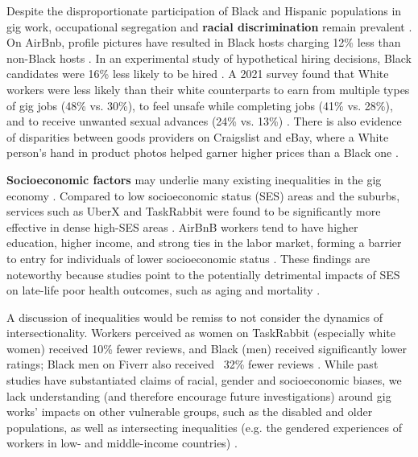 Despite the disproportionate participation of Black and Hispanic populations in gig work, occupational segregation and \textbf{racial discrimination} remain prevalent \cite{England_undated-gk}. On AirBnb, profile pictures have resulted in Black hosts charging 12\% less than non-Black hosts \cite{cSUH}. In an experimental study of hypothetical hiring decisions, Black candidates were 16\% less likely to be hired \cite{Leung2020-rk}. A 2021 survey found that White workers were less likely than their white counterparts to earn from multiple types of gig jobs (48\% vs. 30\%), to feel unsafe while completing jobs (41\% vs. 28\%), and to receive unwanted sexual advances (24\% vs. 13\%) \cite{Gelles-Watnick2021-fz}. There is also evidence of disparities between goods providers on Craigslist and eBay, where a White person's hand in product photos helped garner higher prices than a Black one \cite{Rosenblat2017-bm}.

\textbf{Socioeconomic factors} may underlie many existing inequalities in the gig economy \cite{participation}. Compared to low socioeconomic status (SES) areas and the suburbs, services such as UberX and TaskRabbit were found to be significantly more effective in dense high-SES areas \cite{Thebault-Spieker2017-bv}. AirBnB workers tend to have higher education, higher income, and strong ties in the labor market, forming a barrier to entry for individuals of lower socioeconomic status \cite{Ilsoe_undated-mr}. These findings are noteworthy because studies point to the potentially detrimental impacts of SES on late-life poor health outcomes, such as aging and mortality \cite{Freni-Sterrantino2021-fq,Pathak2022-ah}.

A discussion of inequalities would be remiss to not consider the dynamics of intersectionality. Workers perceived as women on TaskRabbit (especially white women) received 10\% fewer reviews, and Black (men) received significantly lower ratings; Black men on Fiverr also received ~32\% fewer reviews \cite{Hannak2017-xn}. While past studies have substantiated claims of racial, gender and socioeconomic biases, we lack understanding (and therefore encourage future investigations) around gig works' impacts on other vulnerable groups, such as the disabled and older populations, as well as intersecting inequalities (e.g. the gendered experiences of workers in low- and middle-income countries) \cite{Barakat2022-tz,EdLY}.

